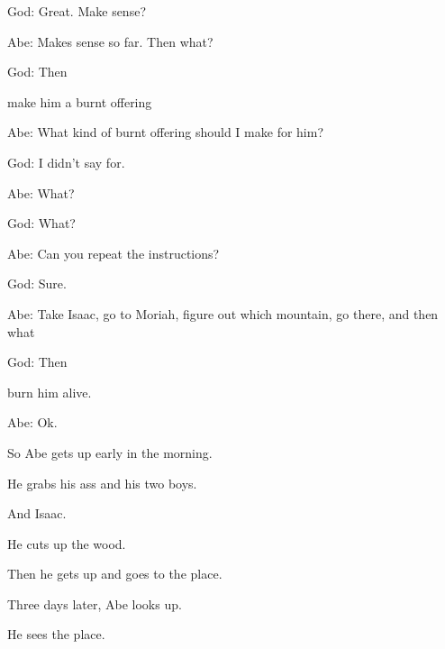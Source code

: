 {\begin{midrash}
	God: Great. Make sense?

	Abe: Makes sense so far. Then what?

	God: Then

	\end{midrash}

	make him a burnt offering

	\begin{midrash}

	Abe: What kind of burnt offering should I make for him?

	God: I didn't say for.

	Abe: What?

	God: What?

	Abe: Can you repeat the instructions?

	God: Sure.

	Abe: Take Isaac, go to Moriah, figure out which mountain, go there, and then what

	God: Then

	\end{midrash}

	burn him alive.

	\begin{midrash}

	Abe: Ok.

	\end{midrash}
}

{
}
{
}
{


	So Abe gets up early in the morning.

	He grabs his ass and his two boys.

	And Isaac.

	He cuts up the wood.

	Then he gets up and goes to the place.
}

{
}
{
}
{


	Three days later, Abe looks up.

	He sees the place.
}

